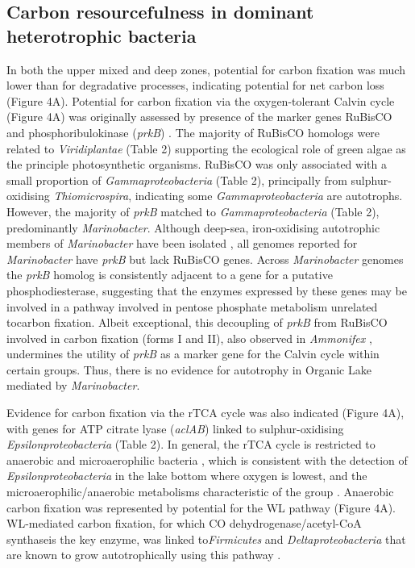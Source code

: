 \subsection{Carbon resourcefulness in dominant heterotrophic bacteria}
\label{subs:carbon}
In both the upper mixed and deep zones, potential for carbon fixation was much lower than for degradative processes, indicating potential for net carbon loss (Figure 4A). 
Potential for carbon fixation via the oxygen-tolerant Calvin cycle (Figure 4A) was originally assessed by presence of the marker genes \ac{RuBisCO} and phosphoribulokinase (\emph{prkB}) \cite{Hugler2011}. 
The majority of \ac{RuBisCO} homologs were related to \emph{Viridiplantae} (Table 2) supporting the ecological role of green algae as the principle photosynthetic organisms. 
\ac{RuBisCO} was only associated with a small proportion of \emph{Gammaproteobacteria} (Table 2), principally from sulphur-oxidising \emph{Thiomicrospira}, indicating some \emph{Gammaproteobacteria} are autotrophs. 
However, the majority of \emph{prkB} matched to \emph{Gammaproteobacteria} (Table 2), predominantly \emph{Marinobacter}. 
Although deep-sea, iron-oxidising autotrophic members of \emph{Marinobacter} have been isolated \cite{Edwards2003}, all genomes reported for \emph{Marinobacter} have \emph{prkB} but lack \ac{RuBisCO} genes. 
Across \emph{Marinobacter} genomes the \emph{prkB} homolog is consistently adjacent to a gene for a putative phosphodiesterase, suggesting that the enzymes expressed by these genes may be involved in a pathway involved in pentose phosphate metabolism unrelated tocarbon fixation. 
Albeit exceptional, this decoupling of \emph{prkB} from \ac{RuBisCO} involved in carbon fixation (forms I and II), also observed in \emph{Ammonifex} \cite{Hugler2011}, undermines the utility of \emph{prkB} as a marker gene for the Calvin cycle within certain groups. 
Thus, there is no evidence for autotrophy in Organic Lake mediated by \emph{Marinobacter}.

Evidence for carbon fixation via the \ac{rTCA} cycle was also indicated (Figure 4A), with genes for ATP citrate lyase (\emph{aclAB}) linked to sulphur-oxidising \emph{Epsilonproteobacteria} (Table 2). 
In general, the \ac{rTCA} cycle is restricted to anaerobic and microaerophilic bacteria \cite{Hugler2011}, which is consistent with the detection of \emph{Epsilonproteobacteria} in the lake bottom where oxygen is lowest, and the microaerophilic/anaerobic metabolisms characteristic of the group \cite{Campbell2006}.
Anaerobic carbon fixation was represented by potential for the \ac{WL} pathway (Figure 4A). 
\ac{WL}-mediated carbon fixation, for which CO dehydrogenase/acetyl-CoA synthaseis the key enzyme, was linked to\emph{Firmicutes} and \emph{Deltaproteobacteria} that are known to grow autotrophically using this pathway \cite{Hugler2011}. 

